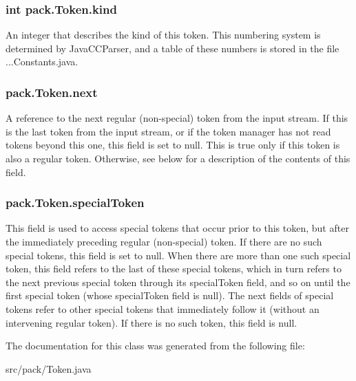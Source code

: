 \subsubsection[{\texorpdfstring{kind}{kind}}]{\setlength{\rightskip}{0pt plus 5cm}int pack.\+Token.\+kind}\hypertarget{classpack_1_1_token_a2556cfc62b26093ed5ca01f8d183ff28}{}\label{classpack_1_1_token_a2556cfc62b26093ed5ca01f8d183ff28}
An integer that describes the kind of this token. This numbering system is determined by Java\+C\+C\+Parser, and a table of these numbers is stored in the file ...Constants.\+java. 
\subsubsection[{\texorpdfstring{next}{next}}]{ pack.\+Token.\+next}\hypertarget{classpack_1_1_token_a45bfb8566505e83f8ce57f27f04b3d3b}{}\label{classpack_1_1_token_a45bfb8566505e83f8ce57f27f04b3d3b}
A reference to the next regular (non-\/special) token from the input stream. If this is the last token from the input stream, or if the token manager has not read tokens beyond this one, this field is set to null. This is true only if this token is also a regular token. Otherwise, see below for a description of the contents of this field. 
\subsubsection[{\texorpdfstring{special\+Token}{specialToken}}]{ pack.\+Token.\+special\+Token}\hypertarget{classpack_1_1_token_a3b1f8d59a9c48ef7f0476e33caf5aa01}{}\label{classpack_1_1_token_a3b1f8d59a9c48ef7f0476e33caf5aa01}
This field is used to access special tokens that occur prior to this token, but after the immediately preceding regular (non-\/special) token. If there are no such special tokens, this field is set to null. When there are more than one such special token, this field refers to the last of these special tokens, which in turn refers to the next previous special token through its special\+Token field, and so on until the first special token (whose special\+Token field is null). The next fields of special tokens refer to other special tokens that immediately follow it (without an intervening regular token). If there is no such token, this field is null. 

The documentation for this class was generated from the following file\+:\begin{DoxyCompactItemize}
\item 
src/pack/Token.\+java\end{DoxyCompactItemize}
